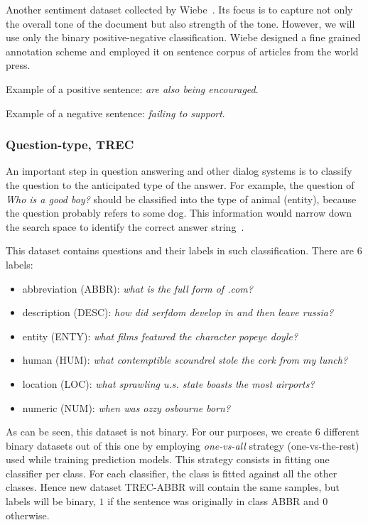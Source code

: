     Another sentiment dataset collected by Wiebe~\cite{wiebe2005annotating}.
    Its focus is to capture not only the overall tone of the document but also strength of the tone.
    However, we will use only the binary positive-negative classification.
    Wiebe designed a fine grained annotation scheme and employed it on sentence corpus of articles from the world press.
    
    Example of a positive sentence:
    \emph{are also being encouraged}.
    
    Example of a negative sentence:
    \emph{failing to support}. 

    
    \subsubsection{Question-type, TREC}\label{sec:TREC}
    
    An important step in question answering and other dialog systems is to classify the question to the anticipated type of the answer. 
    For example, the question of \emph{Who is a good boy?} should be classified into the type of animal (entity), because the question probably refers to some dog.  
    This information would narrow down the search space to identify the correct answer string~\cite{huang2008question}. 
    
    This dataset contains questions and their labels in such classification.
    There are $6$ labels: 
    
    \begin{itemize}
        \item abbreviation (ABBR): \emph{what is the full form of .com?}
        \item description (DESC): \emph{how did serfdom develop in and then leave russia?}
        \item entity (ENTY): \emph{what films featured the character popeye doyle?}
        \item human (HUM): \emph{what contemptible scoundrel stole the cork from my lunch?}
        \item location (LOC): \emph{what sprawling u.s. state boasts the most airports?}
        \item numeric (NUM): \emph{when was ozzy osbourne born?}
    \end{itemize}
    
    As can be seen, this dataset is not binary. 
    For our purposes, we create $6$ different binary datasets out of this one by employing \emph{one-vs-all} strategy (one-vs-the-rest) used while training prediction models.
    This strategy consists in fitting one classifier per class. 
    For each classifier, the class is fitted against all the other classes. 
    Hence new dataset TREC-ABBR will contain the same samples, but labels will be binary, $1$ if the sentence was originally in class ABBR and $0$ otherwise.
    
